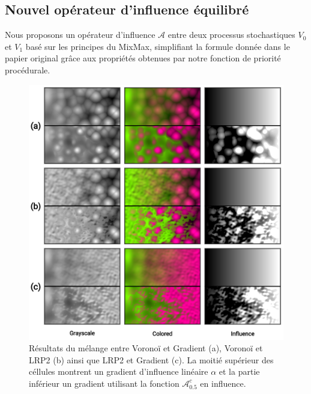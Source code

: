 \documentclass[9pt, twocolumn]{article} %
\begin{document}
\subsection{Nouvel opérateur d'influence équilibré}

Nous proposons un opérateur d'influence $\mathcal{A}$ entre deux processus
stochastiques $V_0$ et $V_1$ basé sur les principes du MixMax, simplifiant la
formule donnée dans le papier original \cite{mixmax} grâce aux propriétés
obtenues par notre fonction de priorité procédurale.

\begin{figure}
  \includegraphics[width=\linewidth]{figures/MixMax_Comparaison.png}
  \caption{
  Résultats du mélange entre Voronoï et Gradient (a), Voronoï et LRP2 (b) ainsi que LRP2 et Gradient (c). La moitié supérieur des céllules montrent un gradient d'influence linéaire $\alpha$ et la partie inférieur un gradient utilisant la fonction $\mathcal{A}^c_{0.5}$ en influence.}
  \label{fig::MixMax_Comparaison}
\end{figure}
\end{document}
